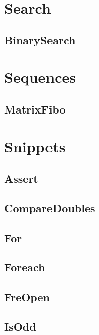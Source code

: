 \section{Search}
\subsection{ BinarySearch}
\raggedbottom
\hrulefill

\section{Sequences}
\subsection{ MatrixFibo}
\raggedbottom
\hrulefill

\section{Snippets}
\subsection{ Assert}
\raggedbottom
\hrulefill
\subsection{ CompareDoubles}
\raggedbottom
\hrulefill
\subsection{ For}
\raggedbottom
\hrulefill
\subsection{ Foreach}
\raggedbottom
\hrulefill
\subsection{ FreOpen}
\raggedbottom
\hrulefill
\subsection{ IsOdd}
\raggedbottom
\hrulefill
